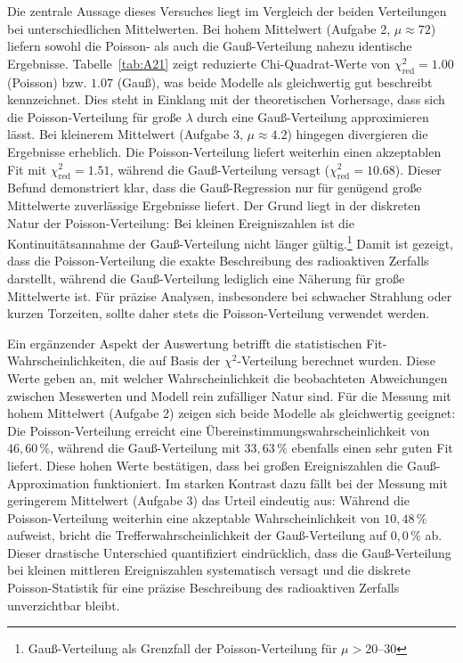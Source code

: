 Die zentrale Aussage dieses Versuches liegt im Vergleich der beiden Verteilungen bei unterschiedlichen Mittelwerten. Bei hohem Mittelwert (Aufgabe 2, $\mu \approx 72$) liefern sowohl die Poisson- als auch die Gauß-Verteilung nahezu identische Ergebnisse. Tabelle~\ref{tab:A21} zeigt reduzierte Chi-Quadrat-Werte von $\chi^2_{\mathrm{red}} = 1.00$ (Poisson) bzw. $1.07$ (Gauß), was beide Modelle als gleichwertig gut beschreibt kennzeichnet. Dies steht in Einklang mit der theoretischen Vorhersage, dass sich die Poisson-Verteilung für große $\lambda$ durch eine Gauß-Verteilung approximieren lässt.
Bei kleinerem Mittelwert (Aufgabe 3, $\mu \approx 4.2$) hingegen divergieren die Ergebnisse erheblich. Die Poisson-Verteilung liefert weiterhin einen akzeptablen Fit mit $\chi^2_{\mathrm{red}} = 1.51$, während die Gauß-Verteilung versagt ($\chi^2_{\mathrm{red}} = 10.68$). Dieser Befund demonstriert klar, dass die Gauß-Regression nur für genügend große Mittelwerte zuverlässige Ergebnisse liefert. Der Grund liegt in der diskreten Natur der Poisson-Verteilung: Bei kleinen Ereigniszahlen ist die Kontinuitätsannahme der Gauß-Verteilung nicht länger gültig.\footnote{Gauß-Verteilung als Grenzfall der Poisson-Verteilung für $\mu > 20\text{--}30$}
Damit ist gezeigt, dass die Poisson-Verteilung die exakte Beschreibung des radioaktiven Zerfalls darstellt, während die Gauß-Verteilung lediglich eine Näherung für große Mittelwerte ist. Für präzise Analysen, insbesondere bei schwacher Strahlung oder kurzen Torzeiten, sollte daher stets die Poisson-Verteilung verwendet werden.

Ein ergänzender Aspekt der Auswertung betrifft die statistischen Fit-Wahrscheinlichkeiten, die auf Basis der $\chi^2$-Verteilung berechnet wurden. Diese Werte geben an, mit welcher Wahrscheinlichkeit die beobachteten Abweichungen zwischen Messwerten und Modell rein zufälliger Natur sind. Für die Messung mit hohem Mittelwert (Aufgabe 2) zeigen sich beide Modelle als gleichwertig geeignet: Die Poisson-Verteilung erreicht eine Übereinstimmungswahrscheinlichkeit von $46{,}60\,\%$, während die Gauß-Verteilung mit $33{,}63\,\%$ ebenfalls einen sehr guten Fit liefert. Diese hohen Werte bestätigen, dass bei großen Ereigniszahlen die Gauß-Approximation funktioniert. Im starken Kontrast dazu fällt bei der Messung mit geringerem Mittelwert (Aufgabe 3) das Urteil eindeutig aus: Während die Poisson-Verteilung weiterhin eine akzeptable Wahrscheinlichkeit von $10{,}48\,\%$ aufweist, bricht die Trefferwahrscheinlichkeit der Gauß-Verteilung auf $0{,}0\,\%$ ab. Dieser drastische Unterschied quantifiziert eindrücklich, dass die Gauß-Verteilung bei kleinen mittleren Ereigniszahlen systematisch versagt und die diskrete Poisson-Statistik für eine präzise Beschreibung des radioaktiven Zerfalls unverzichtbar bleibt.

